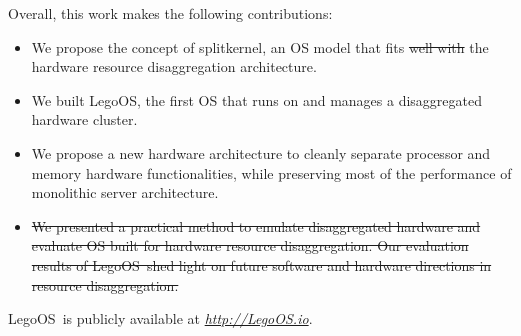 \documentclass[10pt,times,twocolumn]{z2-article}
\renewcommand{\em}{\it}
\newcommand{\splitkernel}{splitkernel}
\newcommand{\lego}{LegoOS}
\providecommand{\DIFdeltex}[1]{{\protect\color{red}\sout{#1}}}                      %
\providecommand{\DIFdelbegin}{} %
\providecommand{\DIFdelend}{} %
\providecommand{\DIFdel}[1]{\texorpdfstring{\DIFdeltex{#1}}{}} %
\newcommand{\DIFscaledelfig}{0.5}
\newlength{\DIFdelgraphicswidth} %
\newlength{\DIFdelgraphicsheight} %
\newcommand{\DIFdelincludegraphics}[2][]{%
\sbox{\DIFdelgraphicsbox}{\DIFOincludegraphics[#1]{#2}}%
\settoboxwidth{\DIFdelgraphicswidth}{\DIFdelgraphicsbox} %
\settoboxtotalheight{\DIFdelgraphicsheight}{\DIFdelgraphicsbox} %
\scalebox{\DIFscaledelfig}{%
\parbox[b]{\DIFdelgraphicswidth}{\usebox{\DIFdelgraphicsbox}\\[-\baselineskip] \rule{\DIFdelgraphicswidth}{0em}}\llap{\resizebox{\DIFdelgraphicswidth}{\DIFdelgraphicsheight}{%
\setlength{\unitlength}{\DIFdelgraphicswidth}%
\begin{picture}(1,1)%
\thicklines\linethickness{2pt} %
{\color[rgb]{1,0,0}\put(0,0){\framebox(1,1){}}}%
{\color[rgb]{1,0,0}\put(0,0){\line( 1,1){1}}}%
{\color[rgb]{1,0,0}\put(0,1){\line(1,-1){1}}}%
\end{picture}%
}\hspace*{3pt}}} %
} %
\DeclareRobustCommand{\DIFdelbegin}{\DIFOdelbegin \let\includegraphics\DIFdelincludegraphics} %
\DeclareRobustCommand{\DIFdelend}{\DIFOaddend \let\includegraphics\DIFOincludegraphics} %
\begin{document}
Overall, this work makes the following contributions:

\begin{itemize}

\vspace{-0.05in}
\item We propose the concept of \splitkernel, an OS model that fits \DIFdelbegin \DIFdel{well with }\DIFdelend the hardware resource disaggregation architecture.

\vspace{-0.05in}
\item We built \lego, the first OS that runs on and manages a disaggregated hardware cluster.

\vspace{-0.05in}
\item We propose a new hardware architecture to cleanly separate processor and memory hardware functionalities, 
while preserving most of the performance of monolithic server architecture.

\DIFdelbegin %
\item%
\DIFdel{We presented a practical method to emulate disaggregated hardware and evaluate OS built for hardware resource disaggregation.
Our evaluation results of \lego\ shed light on future software and hardware directions in resource disaggregation.
}\DIFdelend %

\vspace{-0.05in}

\end{itemize}

\lego\ is publicly available at {\small {\em {\url{http://LegoOS.io}}}}.\\
\end{document}
